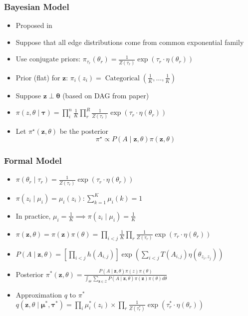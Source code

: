 \documentclass{beamer}
\newcommand{\1}{\mathbbm{1}}
\newcommand{\V}[1]{\ensuremath{\boldsymbol{#1}}} %
\newcommand{\M}[1]{\ensuremath{#1}} %
\begin{document}
\begin{frame}
  \frametitle{Bayesian Model}
  \begin{itemize}
  \item Proposed in \parencite{aicher_adapting_2013,aicher_learning_2015} 
  \item Suppose that all edge distributions come from common exponential family
  \item Use conjugate priors: $\pi_{\tau_r}(\theta_r) = \frac{1}{Z(\tau_r)} \exp(\tau_r \cdot  \eta(\theta_r))$
  \item Prior (flat) for $\V{z}$: $\pi_i(z_i) = \operatorname{Categorical}\left( \frac{1}{K}, \ldots, \frac{1}{K} \right)$
  \item Suppose $\V{z} \perp \V{\theta}$ (based on DAG from paper)
  \item $\pi(z, \theta \mid \V{\tau}) = \prod_i^n \frac{1}{K} \prod_r^R \frac{1}{Z(\tau_r)} \exp( \tau_r \cdot \eta(\theta_r))$
  \item Let $\pi^{\star}(\V{z}, \M{\theta})$ be the posterior
    \begin{equation*}
      \pi^{\star} \propto P(A \mid \V{z}, \M{\theta}) \pi(\V{z}, \M{\theta})
    \end{equation*}

  \end{itemize}
\end{frame}

\begin{frame}
  \frametitle{Formal Model}
  \begin{itemize}
  \item $\pi(\theta_r \mid \tau_r) = \frac{1}{Z(\tau_r)} \exp( \tau_r \cdot \eta(\theta_r))$
  \item $\pi(z_i \mid \mu_i) = \mu_i(z_i): \sum_{k=1}^K \mu_i(k) = 1$
  \item In practice, $\mu_i = \frac{1}{K} \implies \pi(z_i \mid \mu_i) = \frac{1}{K}$
  \item $\pi(\V{z},\M{\theta}) = \pi(\V{z}) \pi(\M{\theta}) = \prod_{i<j} \frac{1}{K} \prod_r \frac{1}{Z(\tau_r)} \exp(\tau_r \cdot \eta(\theta_r))$
  \item $P(A \mid \V{z}, \theta) = \left[ \prod_{i < j}  h(A_{i,j}) \right] \exp( \sum_{i < j} T(A_{i,j}) \eta(\theta_{z_i,z_j}) )$
  \item Posterior $\pi^{*}(\V{z},\M{\theta}) = \frac{P(\M{A} \mid \V{z},\M{\theta}) \pi(z) \pi(\theta)}{\int_{\Theta} \sum_{\V{z} \in \mathcal{Z}} P(\M{A} \mid \V{z}, \M{\theta}) \pi(\V{z}) \pi(\M{\theta}) d \theta}$
  \item Approximation $q$ to $\pi^{*}$ $q(\V{z}, \theta \mid \V{\mu^{*}}, \V{\tau^{*}}) = \prod_i \mu_i^{*}(z_i) \times \prod_r \frac{1}{Z(\tau_r^{*})} \exp( \tau_r^{*} \cdot \eta(\theta_r))$
  \end{itemize}
\end{frame}
\end{document}
